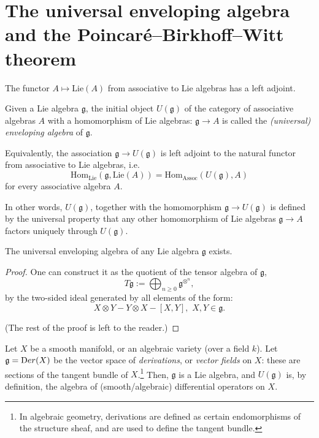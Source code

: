 \section{The universal enveloping algebra and the Poincar\'e--Birkhoff--Witt theorem}
\label{section-enveloping}

The functor $A\mapsto \text{Lie}(A)$ from associative to Lie algebras has a left adjoint.

\begin{definition}
 \label{definition-universal-enveloping-algebra}
Given a Lie algebra $\mathfrak g$, the initial object $U(\mathfrak g)$ of the category of associative algebras $A$ with a homomorphism of Lie algebras: $\mathfrak g\to A$ is called the {\it (universal) enveloping algebra} of $\mathfrak g$. 

Equivalently, the association $\mathfrak g\to U(\mathfrak g)$ is left adjoint to the natural functor from associative to Lie algebras, i.e. 
$$\text{Hom}_{\text{Lie}} (\mathfrak g, \text{Lie}(A)) = \text{Hom}_{\text{Assoc}} (U(\mathfrak g), A)$$
for every associative algebra $A$.
\end{definition}

In other words, $U(\mathfrak g)$, together with the homomorphism $\mathfrak g\to U(\mathfrak g)$ is defined by the universal property that any other homomorphism of Lie algebras $\mathfrak g\to A$ factors uniquely through $U(\mathfrak g)$. 

\begin{proposition}
 \label{proposition-enveloping-exists}
The universal enveloping algebra of any Lie algebra $\mathfrak g$ exists. 
\end{proposition}

\begin{proof}
One can construct it as the quotient of the tensor algebra of $\mathfrak g$,
$$T\mathfrak g:= \bigoplus_{n\ge 0} \mathfrak g^{\otimes^n},$$
by the two-sided ideal generated by all elements of the form: 
$$X\otimes Y - Y\otimes X - [X,Y],\, \, X,Y\in \mathfrak g.$$ 

(The rest of the proof is left to the reader.)

\end{proof}

\begin{example}
 \label{example-derivations-manifold}
Let $X$ be a smooth manifold, or an algebraic variety (over a field $k$). Let $\mathfrak g = {\text Der}(X)$ be the vector space of \emph{derivations}, or \emph{vector fields} on $X$: these are sections of the tangent bundle of $X$.\footnote{In algebraic geometry, derivations are defined as certain endomorphisms of the structure sheaf, and are used to define the tangent bundle.} Then, $\mathfrak g$ is a Lie algebra, and $U(\mathfrak g)$ is, by definition, the algebra of (smooth/algebraic) differential operators on $X$.
\end{example}


